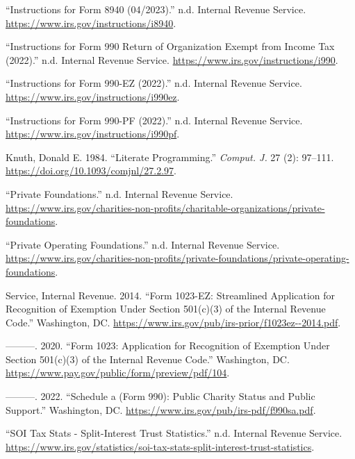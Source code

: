 \documentclass[
  letterpaper,
  DIV=11,
  numbers=noendperiod]{scrreprt}
\newlength{\cslhangindent}
\newlength{\cslentryspacingunit} %
\newenvironment{CSLReferences}[2] %
 {%
  \setlength{\parindent}{0pt}
  \ifodd #1
  \let\oldpar\par
  \def\par{\hangindent=\cslhangindent\oldpar}
  \fi
  \setlength{\parskip}{#2\cslentryspacingunit}
 }%
 {}
\begin{document}
\begin{CSLReferences}{1}{0}
\leavevmode{}%
{``Instructions for Form 8940 (04/2023).''} n.d. Internal Revenue
Service. \url{https://www.irs.gov/instructions/i8940}.

\leavevmode{}%
{``Instructions for Form 990 Return of Organization Exempt from Income
Tax (2022).''} n.d. Internal Revenue Service.
\url{https://www.irs.gov/instructions/i990}.

\leavevmode{}%
{``Instructions for Form 990-EZ (2022).''} n.d. Internal Revenue
Service. \url{https://www.irs.gov/instructions/i990ez}.

\leavevmode{}%
{``Instructions for Form 990-PF (2022).''} n.d. Internal Revenue
Service. \url{https://www.irs.gov/instructions/i990pf}.

\leavevmode{}%
Knuth, Donald E. 1984. {``Literate Programming.''} \emph{Comput. J.} 27
(2): 97--111. \url{https://doi.org/10.1093/comjnl/27.2.97}.

\leavevmode{}%
{``Private Foundations.''} n.d. Internal Revenue Service.
\url{https://www.irs.gov/charities-non-profits/charitable-organizations/private-foundations}.

\leavevmode{}%
{``Private Operating Foundations.''} n.d. Internal Revenue Service.
\url{https://www.irs.gov/charities-non-profits/private-foundations/private-operating-foundations}.

\leavevmode{}%
Service, Internal Revenue. 2014. {``Form 1023-EZ: Streamlined
Application for Recognition of Exemption Under Section 501(c)(3) of the
Internal Revenue Code.''} Washington, DC.
\url{https://www.irs.gov/pub/irs-prior/f1023ez--2014.pdf}.

\leavevmode{}%
---------. 2020. {``Form 1023: Application for Recognition of Exemption
Under Section 501(c)(3) of the Internal Revenue Code.''} Washington, DC.
\url{https://www.pay.gov/public/form/preview/pdf/104}.

\leavevmode{}%
---------. 2022. {``Schedule a (Form 990): Public Charity Status and
Public Support.''} Washington, DC.
\url{https://www.irs.gov/pub/irs-pdf/f990sa.pdf}.

\leavevmode{}%
{``SOI Tax Stats - Split-Interest Trust Statistics.''} n.d. Internal
Revenue Service.
\url{https://www.irs.gov/statistics/soi-tax-stats-split-interest-trust-statistics}.

\end{CSLReferences}
\end{document}
